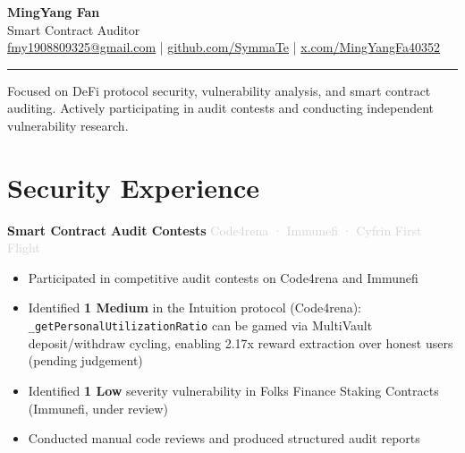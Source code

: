 \documentclass[9pt, a4paper]{article}
\begin{document}

\begin{center}
  {\Huge\bfseries\color{accent} MingYang Fan}\\[3pt]
  {\large\color{lightgray} Smart Contract Auditor}\\[4pt]
  \small
  \href{mailto:fmy1908809325@gmail.com}{fmy1908809325@gmail.com}
  \quad\textcolor{rulegray}{|}\quad
  \href{https://github.com/SymmaTe}{github.com/SymmaTe}
  \quad\textcolor{rulegray}{|}\quad
  \href{https://x.com/MingYangFa40352}{x.com/MingYangFa40352}
\end{center}

\vspace{1pt}
\noindent\color{rulegray}\rule{\textwidth}{0.6pt}
\vspace{2pt}

\noindent\small\color{lightgray}
Focused on DeFi protocol security, vulnerability analysis, and smart contract auditing.
Actively participating in audit contests and conducting independent vulnerability research.

\vspace{1pt}


\section{Security Experience}

\noindent\textbf{Smart Contract Audit Contests} \hfill \textcolor{lightgray}{\small Code4rena · Immunefi · Cyfrin First Flight}

\begin{itemize}
  \item Participated in competitive audit contests on Code4rena and Immunefi
  \item Identified \textbf{1 Medium} in the Intuition protocol (Code4rena): \texttt{\_getPersonalUtilizationRatio} can be gamed via MultiVault deposit/withdraw cycling, enabling 2.17x reward extraction over honest users (pending judgement)
  \item Identified \textbf{1 Low} severity vulnerability in Folks Finance Staking Contracts (Immunefi, under review)
  \item Conducted manual code reviews and produced structured audit reports
\end{itemize}
\end{document}
